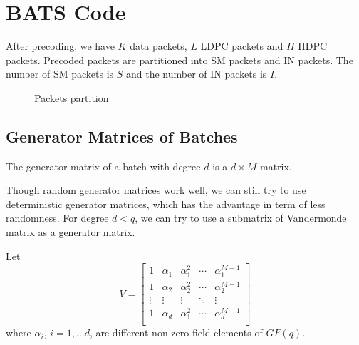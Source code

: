 \documentclass{report}
\newcommand{\ldpcnum}{L}
\newcommand{\hdpcnum}{H}
\newcommand{\smnum}{S}
\newcommand{\innum}{I}
\newcommand{\lineann}[5][0.5]{%
    \begin{scope}[rotate=#3, blue,inner sep=2pt]
        \draw[dotted, blue!40] #2 -- +(0,#1)
            node [coordinate, near end] (a) {};
        \draw[dotted, blue!40] #2 ++(#4,0) -- +(0,#1)
            node [coordinate, near end] (b) {};
        \draw[|<->|] (a) -- node[fill=white] {#5} (b);
    \end{scope}
}
\begin{document}
\section{BATS Code}

After precoding, we have $K$ data packets, $\ldpcnum{}$ LDPC packets
and $\hdpcnum{}$ HDPC packets. Precoded packets are partitioned into
SM packets and IN packets. The number of SM packets is $\smnum{}$ and
the number of IN packets is $\innum{}$.

\begin{figure}
  \centering
  \caption{Packets partition}
  \label{fig:part}
\end{figure}

\subsection{Generator Matrices of Batches}
\label{sec:gener-matr-batch}

The generator matrix of a batch with degree $d$ is a $d\times M$
matrix. 

Though random generator matrices work well, we can still try to use deterministic generator matrices, which
has the advantage in term of less randomness. For degree $d < q$, we
can try to use a submatrix of Vandermonde matrix as a generator
matrix.

Let
\begin{equation*}
  V =
  \begin{bmatrix}
    1 & \alpha_1 & \alpha_1^2 & \cdots & \alpha_1^{M-1} \\
    1 & \alpha_2 & \alpha_2^2 & \cdots & \alpha_2^{M-1} \\
    \vdots & \vdots & \vdots & \ddots & \vdots \\
    1 & \alpha_d & \alpha_1^2 & \cdots & \alpha_d^{M-1} \\
  \end{bmatrix}
\end{equation*}
where $\alpha_i$, $i=1,\dots d$, are different non-zero field
elements of $GF(q)$.
\end{document}
